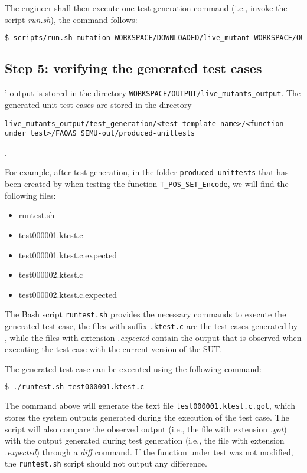 The engineer shall then execute one test generation command (i.e., invoke the script \emph{run.sh}), the command follows:

\begin{lstlisting}[language=bash]
 $ scripts/run.sh mutation WORKSPACE/DOWNLOADED/live_mutant WORKSPACE/OUTPUT/live_mutants_output
\end{lstlisting}

\subsection{Step 5: verifying the generated test cases}

\SEMUS' output is stored in the directory \texttt{WORKSPACE/OUTPUT/live\_mutants\_output}. The generated unit test cases are stored in the directory \begin{small}\texttt{live\_mutants\_output/test\_generation/<test template name>/<function under test>/FAQAS\_SEMU-out/produced-unittests}\end{small}.

For example, after test generation, in the folder \texttt{produced-unittests} that has been created by \SEMUS when testing the function \texttt{T\_POS\_SET\_Encode}, we will find the following files:

\begin{itemize}
\item runtest.sh
\item test000001.ktest.c
\item test000001.ktest.c.expected
\item test000002.ktest.c
\item test000002.ktest.c.expected
\end{itemize}

The Bash script \texttt{runtest.sh} provides the necessary commands to execute the generated test case, the files with suffix \texttt{.ktest.c}  are the test cases generated by \SEMUS, while the files with extension \emph{.expected} contain the output that is observed when executing the test case with the current version of the SUT.

The generated test case can be executed using the following command:

\begin{lstlisting}[language=bash]
 $ ./runtest.sh test000001.ktest.c
\end{lstlisting}

The command above will generate the text file \texttt{test000001.ktest.c.got}, which stores the system outputs generated during the execution of the test case. The script will also compare the observed output (i.e., the file with extension \emph{.got}) with the output generated during test generation (i.e., the file with extension \emph{.expected}) through a \emph{diff} command. If the function under test was not modified, the \texttt{runtest.sh} script should not output any difference. 

